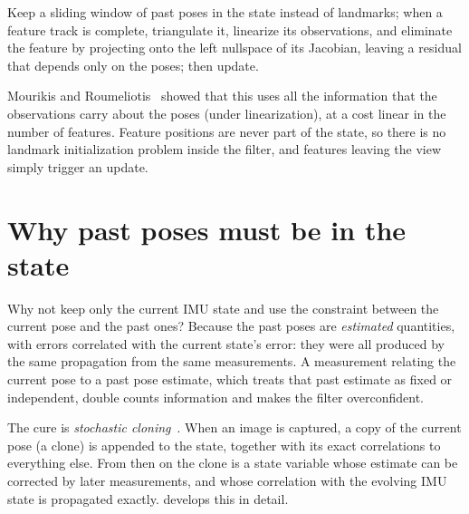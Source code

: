 \begin{keyidea}
Keep a sliding window of past poses in the state instead of landmarks; when a feature track is complete,
triangulate it, linearize its observations, and eliminate the feature by projecting onto the left nullspace of its
Jacobian, leaving a residual that depends only on the poses; then update.
\end{keyidea}

Mourikis and Roumeliotis~\cite{mourikis2007msckf} showed that this uses all the information that the observations carry about
the poses (under linearization), at a cost linear in the number of features. Feature positions are never part of the
state, so there is no landmark initialization problem inside the filter, and features leaving the view simply trigger an
update.

\section{Why past poses must be in the state}

Why not keep only the current IMU state and use the constraint between the current pose and the past ones? Because the
past poses are \emph{estimated} quantities, with errors correlated with the current state's error: they were all produced by
the same propagation from the same measurements. A measurement relating the current pose to a past pose estimate, which
treats that past estimate as fixed or independent, double counts information and makes the filter overconfident.

The cure is \emph{stochastic cloning}~\cite{roumeliotis2002cloning}. When an image is captured, a copy of the current pose (a
clone) is appended to the state, together with its exact correlations to everything else. From then on the clone is a
state variable whose estimate can be corrected by later measurements, and whose correlation with the evolving IMU state is
propagated exactly.  develops this in detail.

